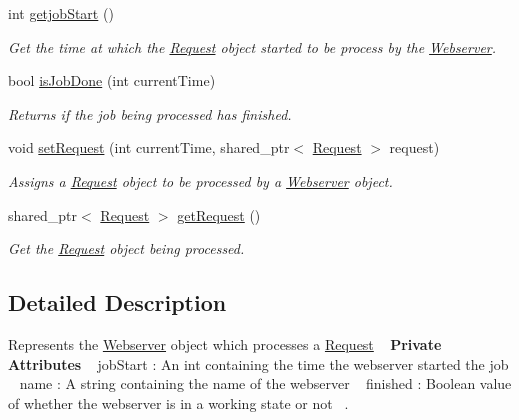 \begin{DoxyCompactItemize}
int \hyperlink{classWebserver_ad1ee2d5ae63d1d2674156eb29c3f92ee}{getjob\+Start} ()
\begin{DoxyCompactList}\small\item\em Get the time at which the \hyperlink{classRequest}{Request} object started to be process by the \hyperlink{classWebserver}{Webserver}. \end{DoxyCompactList}\item 
bool \hyperlink{classWebserver_a25d0b2f418c84058bb49408aacee9745}{is\+Job\+Done} (int current\+Time)
\begin{DoxyCompactList}\small\item\em Returns if the job being processed has finished. \end{DoxyCompactList}\item 
void \hyperlink{classWebserver_af579724e554c818287932988c0de111e}{set\+Request} (int current\+Time, shared\+\_\+ptr$<$ \hyperlink{classRequest}{Request} $>$ request)
\begin{DoxyCompactList}\small\item\em Assigns a \hyperlink{classRequest}{Request} object to be processed by a \hyperlink{classWebserver}{Webserver} object. \end{DoxyCompactList}\item 
shared\+\_\+ptr$<$ \hyperlink{classRequest}{Request} $>$ \hyperlink{classWebserver_ad885e697f7623ae3b775664406f57cd0}{get\+Request} ()
\begin{DoxyCompactList}\small\item\em Get the \hyperlink{classRequest}{Request} object being processed. \end{DoxyCompactList}\end{DoxyCompactItemize}


\subsection{Detailed Description}
Represents the \hyperlink{classWebserver}{Webserver} object which processes a \hyperlink{classRequest}{Request} ~\newline
{\bfseries Private Attributes} ~\newline
job\+Start \+: An int containing the time the webserver started the job ~\newline
 name \+: A string containing the name of the webserver ~\newline
 finished \+: Boolean value of whether the webserver is in a working state or not~\newline
. 

